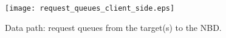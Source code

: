 \documentclass[a4paper,12pt,twoside]{report}
\begin{document}
\begin{figure}[ht]
  \centering
  \texttt{[image: request\_queues\_client\_side.eps]}
  \caption{\label{fig:request_queues}Data path: request queues from
    the target(s) to the NBD.}
\end{figure}



\newpage

\end{document}
